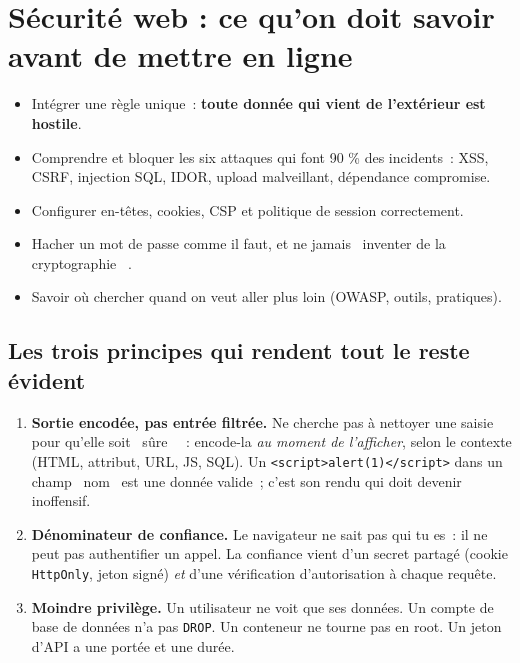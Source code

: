 \chapter{S\'ecurit\'e web : ce qu'on doit savoir avant de mettre en ligne}
\label{ch-js-secu}

\begin{objectif}
\begin{itemize}
  \item Int\'egrer une r\`egle unique~: \textbf{toute donn\'ee qui vient de l'ext\'erieur est hostile}.
  \item Comprendre et bloquer les six attaques qui font 90 \% des incidents~: XSS, CSRF,
        injection SQL, IDOR, upload malveillant, d\'ependance compromise.
  \item Configurer en-t\^etes, cookies, CSP et politique de session correctement.
  \item Hacher un mot de passe comme il faut, et ne jamais \og ~inventer de la cryptographie~ \fg{}.
  \item Savoir o\`u chercher quand on veut aller plus loin (OWASP, outils, pratiques).
\end{itemize}
\end{objectif}

\section{Les trois principes qui rendent tout le reste \'evident}

\begin{enumerate}
  \item \textbf{Sortie encod\'ee, pas entr\'ee filtr\'ee.} Ne cherche pas \`a nettoyer une saisie pour
        qu'elle soit \og ~s\^ure~ \fg{}~: encode-la \emph{au moment de l'afficher}, selon le contexte
        (HTML, attribut, URL, JS, SQL). Un \verb|<script>alert(1)</script>| dans un champ \og ~nom~ \fg{}
        est une donn\'ee valide~; c'est son rendu qui doit devenir inoffensif.
  \item \textbf{D\'enominateur de confiance.} Le navigateur ne sait pas qui tu es~: il ne peut pas
        authentifier un appel. La confiance vient d'un secret partag\'e (cookie \verb|HttpOnly|,
        jeton sign\'e) \emph{et} d'une v\'erification d'autorisation \`a chaque requ\^ete.
  \item \textbf{Moindre privil\`ege.} Un utilisateur ne voit que ses donn\'ees. Un compte de base de
        donn\'ees n'a pas \verb|DROP|. Un conteneur ne tourne pas en root. Un jeton d'API a une
        port\'ee et une dur\'ee.
\end{enumerate}


